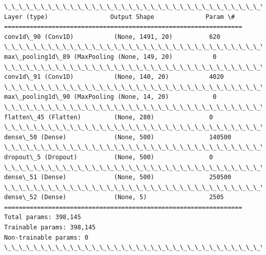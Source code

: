 \documentclass[11pt]{article}
\begin{document}
    \begin{Verbatim}[commandchars=\\\{\}]
\_\_\_\_\_\_\_\_\_\_\_\_\_\_\_\_\_\_\_\_\_\_\_\_\_\_\_\_\_\_\_\_\_\_\_\_\_\_\_\_\_\_\_\_\_\_\_\_\_\_\_\_\_\_\_\_\_\_\_\_\_\_\_\_\_
Layer (type)                 Output Shape              Param \#   
=================================================================
conv1d\_90 (Conv1D)           (None, 1491, 20)          620       
\_\_\_\_\_\_\_\_\_\_\_\_\_\_\_\_\_\_\_\_\_\_\_\_\_\_\_\_\_\_\_\_\_\_\_\_\_\_\_\_\_\_\_\_\_\_\_\_\_\_\_\_\_\_\_\_\_\_\_\_\_\_\_\_\_
max\_pooling1d\_89 (MaxPooling (None, 149, 20)           0         
\_\_\_\_\_\_\_\_\_\_\_\_\_\_\_\_\_\_\_\_\_\_\_\_\_\_\_\_\_\_\_\_\_\_\_\_\_\_\_\_\_\_\_\_\_\_\_\_\_\_\_\_\_\_\_\_\_\_\_\_\_\_\_\_\_
conv1d\_91 (Conv1D)           (None, 140, 20)           4020      
\_\_\_\_\_\_\_\_\_\_\_\_\_\_\_\_\_\_\_\_\_\_\_\_\_\_\_\_\_\_\_\_\_\_\_\_\_\_\_\_\_\_\_\_\_\_\_\_\_\_\_\_\_\_\_\_\_\_\_\_\_\_\_\_\_
max\_pooling1d\_90 (MaxPooling (None, 14, 20)            0         
\_\_\_\_\_\_\_\_\_\_\_\_\_\_\_\_\_\_\_\_\_\_\_\_\_\_\_\_\_\_\_\_\_\_\_\_\_\_\_\_\_\_\_\_\_\_\_\_\_\_\_\_\_\_\_\_\_\_\_\_\_\_\_\_\_
flatten\_45 (Flatten)         (None, 280)               0         
\_\_\_\_\_\_\_\_\_\_\_\_\_\_\_\_\_\_\_\_\_\_\_\_\_\_\_\_\_\_\_\_\_\_\_\_\_\_\_\_\_\_\_\_\_\_\_\_\_\_\_\_\_\_\_\_\_\_\_\_\_\_\_\_\_
dense\_50 (Dense)             (None, 500)               140500    
\_\_\_\_\_\_\_\_\_\_\_\_\_\_\_\_\_\_\_\_\_\_\_\_\_\_\_\_\_\_\_\_\_\_\_\_\_\_\_\_\_\_\_\_\_\_\_\_\_\_\_\_\_\_\_\_\_\_\_\_\_\_\_\_\_
dropout\_5 (Dropout)          (None, 500)               0         
\_\_\_\_\_\_\_\_\_\_\_\_\_\_\_\_\_\_\_\_\_\_\_\_\_\_\_\_\_\_\_\_\_\_\_\_\_\_\_\_\_\_\_\_\_\_\_\_\_\_\_\_\_\_\_\_\_\_\_\_\_\_\_\_\_
dense\_51 (Dense)             (None, 500)               250500    
\_\_\_\_\_\_\_\_\_\_\_\_\_\_\_\_\_\_\_\_\_\_\_\_\_\_\_\_\_\_\_\_\_\_\_\_\_\_\_\_\_\_\_\_\_\_\_\_\_\_\_\_\_\_\_\_\_\_\_\_\_\_\_\_\_
dense\_52 (Dense)             (None, 5)                 2505      
=================================================================
Total params: 398,145
Trainable params: 398,145
Non-trainable params: 0
\_\_\_\_\_\_\_\_\_\_\_\_\_\_\_\_\_\_\_\_\_\_\_\_\_\_\_\_\_\_\_\_\_\_\_\_\_\_\_\_\_\_\_\_\_\_\_\_\_\_\_\_\_\_\_\_\_\_\_\_\_\_\_\_\_

    \end{Verbatim}

    \begin{center}
    \end{center}
    { \hspace*{\fill} \\}
    
\end{document}
